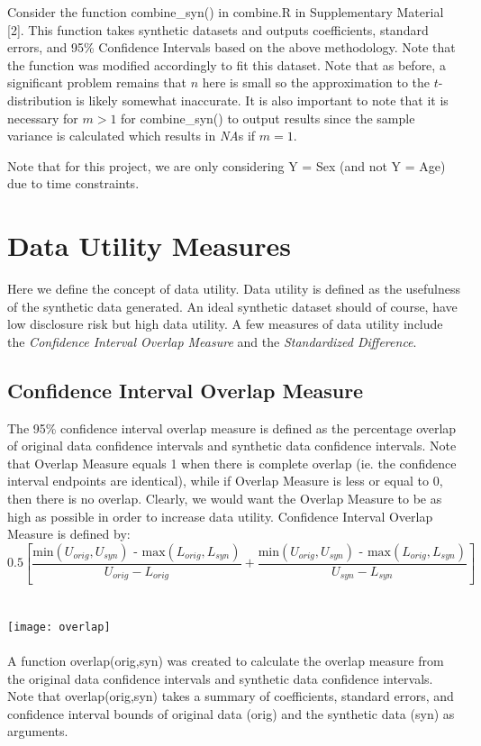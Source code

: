 \documentclass[12pt]{article}
\begin{document}
Consider the function combine\_syn() in combine.R in Supplementary Material [2]. This function takes synthetic datasets and outputs coefficients, standard errors, and 95\% Confidence Intervals based on the above methodology. Note that the function was modified accordingly to fit this dataset. Note that as before, a significant problem remains that $n$ here is small so the approximation to the $t$-distribution is likely somewhat inaccurate. It is also important to note that it is necessary for $m>1$ for combine\_syn() to output results since the sample variance is calculated which results in \textit{NA}s if $m=1$.

Note that for this project, we are only considering Y = Sex (and not Y = Age) due to time constraints.

\section*{Data Utility Measures}
Here we define the concept of data utility. Data utility is defined as the usefulness of the synthetic data generated. An ideal synthetic dataset should of course, have low disclosure risk but high data utility. A few measures of data utility include the \textit{Confidence Interval Overlap Measure} and the \textit{Standardized Difference}.

\subsection*{Confidence Interval Overlap Measure}
The 95\% confidence interval overlap measure is defined as the percentage overlap of original data confidence intervals and synthetic data confidence intervals. Note that Overlap Measure equals 1 when there is complete overlap (ie. the confidence interval endpoints are identical), while if Overlap Measure is less or equal to 0, then there is no overlap. Clearly, we would want the Overlap Measure to be as high as possible in order to increase data utility. Confidence Interval Overlap Measure is defined by:
$$0.5[\frac{\text{min$(U_{orig},U_{syn})$ - max$(L_{orig},L_{syn})$}}{\text{$U_{orig} - L_{orig}$}} + \frac{\text{min$(U_{orig},U_{syn})$ - max$(L_{orig},L_{syn})$}}{\text{$U_{syn} - L_{syn}$}}]$$ \\\\
\texttt{[image: overlap]}\\\\

A function overlap(orig,syn) was created to calculate the overlap measure from the original data confidence intervals and synthetic data confidence intervals. Note that overlap(orig,syn) takes a summary of coefficients, standard errors, and confidence interval bounds of original data (orig) and the synthetic data (syn) as arguments. 
\end{document}
